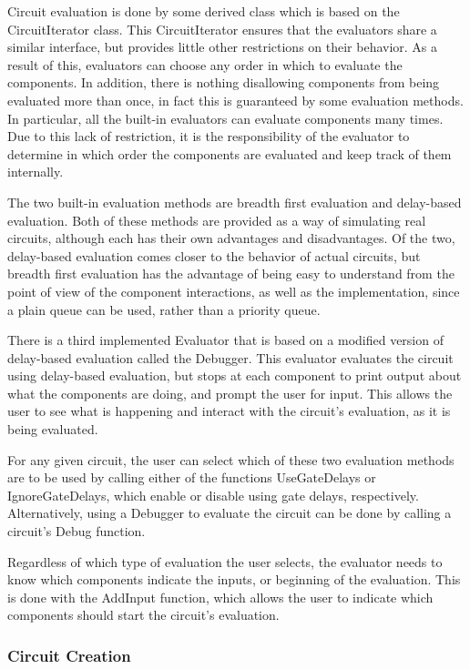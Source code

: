 \documentclass{article}
\begin{document}
Circuit evaluation is done by some derived class which is based on the CircuitIterator class. This CircuitIterator ensures that the evaluators share a similar interface, but provides little other restrictions on their behavior. As a result of this, evaluators can choose any order in which to evaluate the components. In addition, there is nothing disallowing components from being evaluated more than once, in fact this is guaranteed by some evaluation methods. In particular, all the built-in evaluators can evaluate components many times. Due to this lack of restriction, it is the responsibility of the evaluator to determine in which order the components are evaluated and keep track of them internally.

The two built-in evaluation methods are breadth first evaluation and delay-based evaluation. Both of these methods are provided as a way of simulating real circuits, although each has their own advantages and disadvantages. Of the two, delay-based evaluation comes closer to the behavior of actual circuits, but breadth first evaluation has the advantage of being easy to understand from the point of view of the component interactions, as well as the implementation, since a plain queue can be used, rather than a priority queue.

There is a third implemented Evaluator that is based on a modified version of delay-based evaluation called the Debugger. This evaluator evaluates the circuit using delay-based evaluation, but stops at each component to print output about what the components are doing, and prompt the user for input. This allows the user to see what is happening and interact with the circuit’s evaluation, as it is being evaluated.

For any given circuit, the user can select which of these two evaluation methods are to be used by calling either of the functions UseGateDelays or IgnoreGateDelays, which enable or disable using gate delays, respectively. Alternatively, using a Debugger to evaluate the circuit can be done by calling a circuit’s Debug function.

Regardless of which type of evaluation the user selects, the evaluator needs to know which components indicate the inputs, or beginning of the evaluation. This is done with the AddInput function, which allows the user to indicate which components should start the circuit’s evaluation.

\subsubsection{Circuit Creation}
\end{document}
